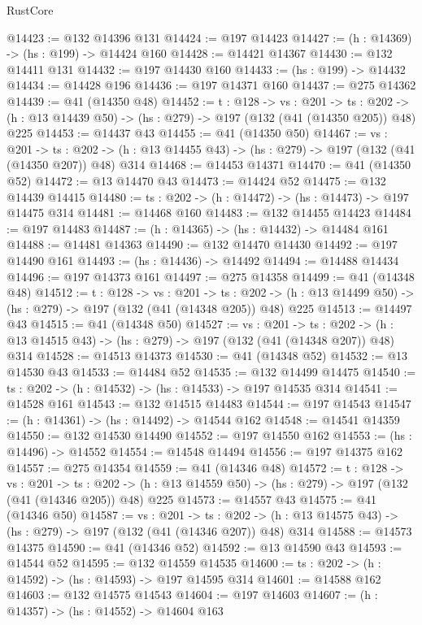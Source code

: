 \begin{lexlean}{RustCore}
\begin{coremodule}
@14423 := @132 @14396 @131
@14424 := @197 @14423
@14427 := (h : @14369) -> (hs : @199) -> @14424 @160
@14428 := @14421 @14367
@14430 := @132 @14411 @131
@14432 := @197 @14430 @160
@14433 := (hs : @199) -> @14432
@14434 := @14428 @196
@14436 := @197 @14371 @160
@14437 := @275 @14362
@14439 := @41 (@14350 @48)
@14452 := {t : @128} ->
  {vs : @201} ->
  {ts : @202} -> (h : @13 @14439 @50) -> (hs : @279) -> @197 (@132 (@41 (@14350 @205)) @48) @225
@14453 := @14437 @43
@14455 := @41 (@14350 @50)
@14467 := {vs : @201} ->
  {ts : @202} -> (h : @13 @14455 @43) -> (hs : @279) -> @197 (@132 (@41 (@14350 @207)) @48) @314
@14468 := @14453 @14371
@14470 := @41 (@14350 @52)
@14472 := @13 @14470 @43
@14473 := @14424 @52
@14475 := @132 @14439 @14415
@14480 := {ts : @202} -> (h : @14472) -> (hs : @14473) -> @197 @14475 @314
@14481 := @14468 @160
@14483 := @132 @14455 @14423
@14484 := @197 @14483
@14487 := (h : @14365) -> (hs : @14432) -> @14484 @161
@14488 := @14481 @14363
@14490 := @132 @14470 @14430
@14492 := @197 @14490 @161
@14493 := (hs : @14436) -> @14492
@14494 := @14488 @14434
@14496 := @197 @14373 @161
@14497 := @275 @14358
@14499 := @41 (@14348 @48)
@14512 := {t : @128} ->
  {vs : @201} ->
  {ts : @202} -> (h : @13 @14499 @50) -> (hs : @279) -> @197 (@132 (@41 (@14348 @205)) @48) @225
@14513 := @14497 @43
@14515 := @41 (@14348 @50)
@14527 := {vs : @201} ->
  {ts : @202} -> (h : @13 @14515 @43) -> (hs : @279) -> @197 (@132 (@41 (@14348 @207)) @48) @314
@14528 := @14513 @14373
@14530 := @41 (@14348 @52)
@14532 := @13 @14530 @43
@14533 := @14484 @52
@14535 := @132 @14499 @14475
@14540 := {ts : @202} -> (h : @14532) -> (hs : @14533) -> @197 @14535 @314
@14541 := @14528 @161
@14543 := @132 @14515 @14483
@14544 := @197 @14543
@14547 := (h : @14361) -> (hs : @14492) -> @14544 @162
@14548 := @14541 @14359
@14550 := @132 @14530 @14490
@14552 := @197 @14550 @162
@14553 := (hs : @14496) -> @14552
@14554 := @14548 @14494
@14556 := @197 @14375 @162
@14557 := @275 @14354
@14559 := @41 (@14346 @48)
@14572 := {t : @128} ->
  {vs : @201} ->
  {ts : @202} -> (h : @13 @14559 @50) -> (hs : @279) -> @197 (@132 (@41 (@14346 @205)) @48) @225
@14573 := @14557 @43
@14575 := @41 (@14346 @50)
@14587 := {vs : @201} ->
  {ts : @202} -> (h : @13 @14575 @43) -> (hs : @279) -> @197 (@132 (@41 (@14346 @207)) @48) @314
@14588 := @14573 @14375
@14590 := @41 (@14346 @52)
@14592 := @13 @14590 @43
@14593 := @14544 @52
@14595 := @132 @14559 @14535
@14600 := {ts : @202} -> (h : @14592) -> (hs : @14593) -> @197 @14595 @314
@14601 := @14588 @162
@14603 := @132 @14575 @14543
@14604 := @197 @14603
@14607 := (h : @14357) -> (hs : @14552) -> @14604 @163

\end{coremodule}
\end{lexlean}
